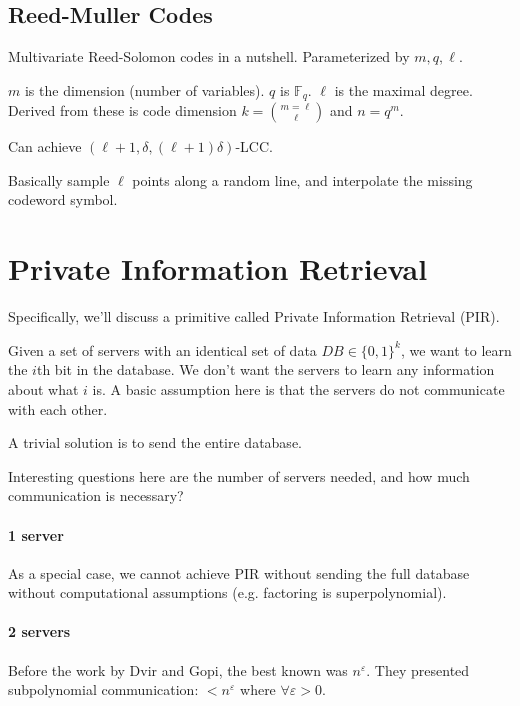\documentclass{idc_msc}
\newcommand{\Fq}[1][q]{{\mathbb{F}_{#1}}}
\begin{document}
\subsection{Reed-Muller Codes}

Multivariate Reed-Solomon codes in a nutshell. Parameterized by \(m,q,\ell\).

\(m\) is the dimension (number of variables). \(q\) is \(\Fq\). \(\ell\) is the maximal degree.
Derived from these is code dimension \(k = \binom{m = \ell}{\ell}\) and \(n = q^m\).

Can achieve \((\ell+1,\delta, (\ell + 1)\delta)\)-LCC.

Basically sample \(\ell\) points along a random line, and interpolate the missing codeword symbol.


\clearpage
\section{Private Information Retrieval}

Specifically, we'll discuss a primitive called Private Information Retrieval (PIR).

Given a set of servers with an identical set of data \(DB \in \{0,1\}^k\), we want to learn the \(i\)th bit in the database.
We don't want the servers to learn any information about what \(i\) is.
A basic assumption here is that the servers do not communicate with each other.

A trivial solution is to send the entire database.

Interesting questions here are the number of servers needed, and how much communication is necessary?

\paragraph{1 server}

As a special case, we cannot achieve PIR without sending the full database without computational assumptions (e.g. factoring is superpolynomial).

\paragraph{2 servers}

Before the work by Dvir and Gopi\cite{DBLP:journals/jacm/DvirG16}, the best known was \(n^\varepsilon\).
They presented subpolynomial communication: \(< n^\varepsilon\) where \(\forall \varepsilon > 0\).
\end{document}
